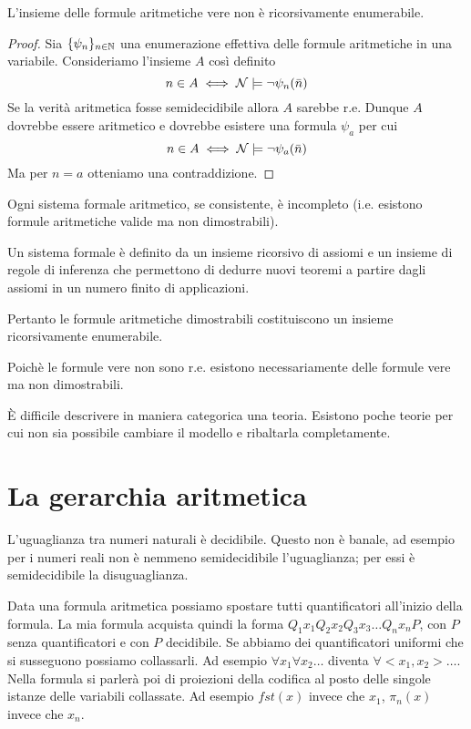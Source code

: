 \begin{thm}
    L'insieme delle formule aritmetiche vere non è ricorsivamente enumerabile.
\end{thm}
\begin{proof}
    Sia $\{\psi_{n}\}_{n \in \mathbb{N}}$ una enumerazione effettiva delle formule aritmetiche in una
    variabile. Consideriamo l'insieme $A$ così definito
    \begin{equation*}
        n \in A \iff \mathcal{N} \models \lnot \psi_{n}(\bar{n})
    \end{equation*}
    Se la verità aritmetica fosse semidecidibile allora $A$ sarebbe r.e. Dunque $A$ dovrebbe essere
    aritmetico e dovrebbe esistere una formula $\psi_{a}$ per cui
    \begin{equation*}
        n \in A \iff \mathcal{N} \models \lnot \psi_{a}(\bar{n})
    \end{equation*}
    Ma per $n=a$ otteniamo una contraddizione.
\end{proof}

\begin{thm}
    Ogni sistema formale aritmetico, se consistente, è incompleto (i.e. esistono formule
    aritmetiche valide ma non dimostrabili).
\end{thm}

Un sistema formale è definito da un insieme ricorsivo di assiomi e un insieme di
regole di inferenza che permettono di dedurre nuovi teoremi a partire dagli
assiomi in un numero finito di applicazioni.

Pertanto le formule aritmetiche dimostrabili costituiscono un insieme
ricorsivamente enumerabile.

Poichè le formule vere non sono r.e. esistono necessariamente delle formule
vere ma non dimostrabili.

È difficile descrivere in maniera categorica una teoria. Esistono poche teorie per cui non sia
possibile cambiare il modello e ribaltarla completamente.

\section{La gerarchia aritmetica}

L'uguaglianza tra numeri naturali è decidibile. Questo non è banale, ad esempio per i numeri reali
non è nemmeno semidecidibile l'uguaglianza; per essi è semidecidibile la disuguaglianza.

Data una formula aritmetica possiamo spostare tutti quantificatori all'inizio della formula. La mia
formula acquista quindi la forma $Q_{1} x_{1} Q_{2} x_{2} Q_{3}x_{3} \dotsc Q_{n}x_{n}P$, con $P$ senza
quantificatori e con $P$ decidibile. Se abbiamo dei quantificatori uniformi che si susseguono possiamo
collassarli. Ad esempio $\forall x_{1} \forall x_{2} \dotsc$ diventa $\forall <x_{1},x_{2}> \dotsc$. Nella
formula si parlerà poi di proiezioni della codifica al posto delle singole istanze delle variabili
collassate. Ad esempio $\textit{fst}(x)$ invece che $x_{1}$, $\pi_{n}(x)$ invece che $x_{n}$.

